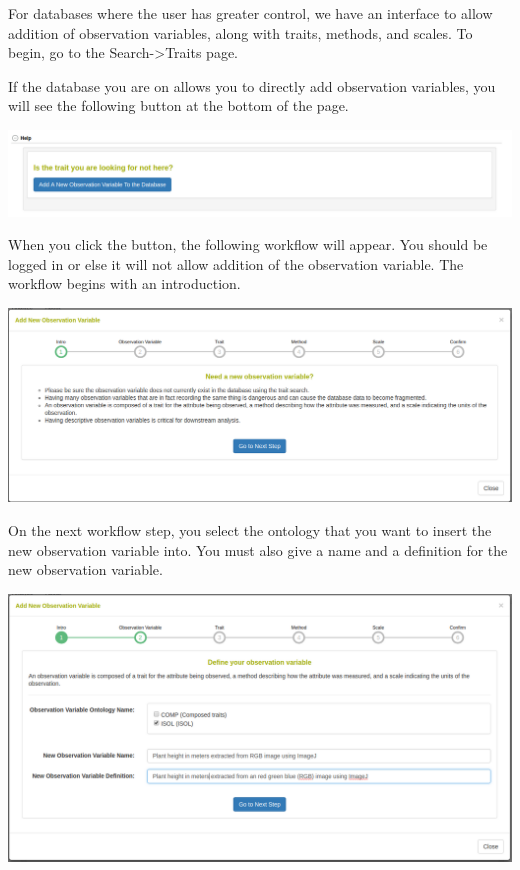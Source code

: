 \documentclass[
  12pt,
]{book}
\begin{document}
For databases where the user has greater control, we have an interface to allow addition of observation variables, along with traits, methods, and scales. To begin, go to the Search-\textgreater Traits page.

If the database you are on allows you to directly add observation variables, you will see the following button at the bottom of the page.

\begin{center}\includegraphics[width=0.95\linewidth]{assets/images/manage_observation_variables_start_button} \end{center}

When you click the button, the following workflow will appear. You should be logged in or else it will not allow addition of the observation variable. The workflow begins with an introduction.

\begin{center}\includegraphics[width=0.95\linewidth]{assets/images/manage_observation_variables_workflow_intro} \end{center}

On the next workflow step, you select the ontology that you want to insert the new observation variable into. You must also give a name and a definition for the new observation variable.

\begin{center}\includegraphics[width=0.95\linewidth]{assets/images/manage_observation_variables_workflow_observation_variable} \end{center}
\end{document}
